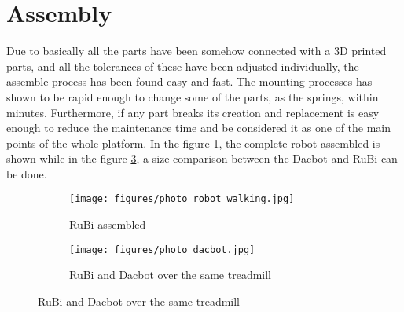\section{Assembly} %
\label{sec:assembly}
Due to basically all the parts have been somehow connected with a 3D printed parts, and all the tolerances of these have been adjusted individually, the assemble process has been found easy and fast.
The mounting processes has shown to be rapid enough to change some of the parts, as the springs, within minutes.
Furthermore, if any part breaks its creation and replacement is easy enough to reduce the maintenance time and be considered it as one of the main points of the whole platform.
In the figure \ref{fig:photo_robot_walking}, the complete robot assembled is shown while in the figure \ref{fig:photo_dacbot}, a size comparison between the Dacbot \cite{dacbot1} and RuBi can be done.

\begin{figure}[ht!]
    \centering
    \begin{subfigure}[b]{0.49\textwidth}
        \texttt{[image: figures/photo\_robot\_walking.jpg]}
        \caption{RuBi assembled}
        \label{fig:photo_robot_walking}
    \end{subfigure}
    \begin{subfigure}[b]{0.49\textwidth}
        \texttt{[image: figures/photo\_dacbot.jpg]}
        \caption{RuBi and Dacbot over the same treadmill}
        \label{fig:photo_dacbot}
    \end{subfigure}
\end{figure}    

